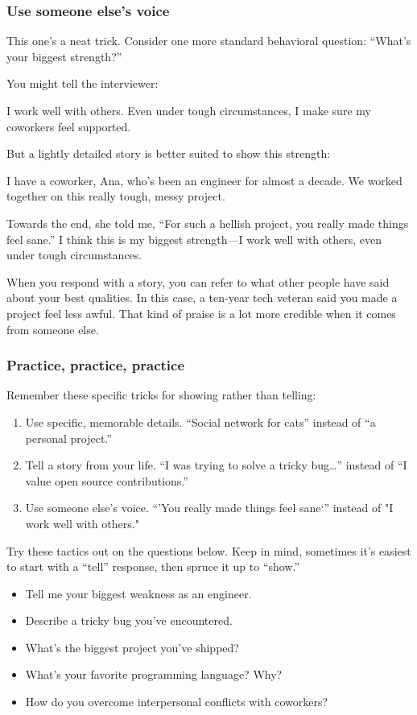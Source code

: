 \documentclass{article}
\begin{document}
\subsubsection{Use someone else’s voice}

This one’s a neat trick. Consider one more standard behavioral question: “What’s your biggest strength?”

You might tell the interviewer:

\begin{tcolorbox}
I work well with others. Even under tough circumstances, I make sure my coworkers feel supported.  
\end{tcolorbox}


But a lightly detailed story is better suited to show this strength:

\begin{tcolorbox}
  I have a coworker, Ana, who’s been an engineer for almost a decade. We worked together on this really tough, messy project.

  Towards the end, she told me, “For such a hellish project, you really made things feel sane.” I think this is my biggest strength—I work well with others, even under tough circumstances.
\end{tcolorbox}

When you respond with a story, you can refer to what other people have said about your best qualities. In this case, a ten-year tech veteran said you made a project feel less awful. That kind of praise is a lot more credible when it comes from someone else.



\subsubsection{Practice, practice, practice}

Remember these specific tricks for showing rather than telling:

\begin{enumerate}
\item Use specific, memorable details. “Social network for cats” instead of “a personal project.”
\item Tell a story from your life. “I was trying to solve a tricky bug…” instead of “I value open source contributions.”
\item Use someone else’s voice. “’You really made things feel sane‘” instead of "I work well with others."
\end{enumerate}


Try these tactics out on the questions below. Keep in mind, sometimes it’s easiest to start with a “tell” response, then spruce it up to “show.”


\begin{itemize}
\item Tell me your biggest weakness as an engineer.
\item Describe a tricky bug you’ve encountered.
\item What’s the biggest project you’ve shipped?
\item What’s your favorite programming language? Why?
\item How do you overcome interpersonal conflicts with coworkers?
\end{itemize}
\end{document}
